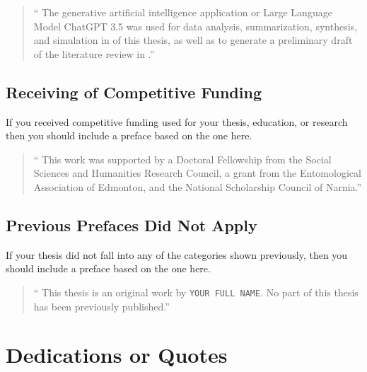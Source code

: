 			\begin{quote}
				\singlespacing
				\enquote{%
					The generative artificial intelligence application or Large Language Model ChatGPT 3.5 was used for data analysis, summarization, synthesis, and simulation in  of this thesis, as well as to generate a preliminary draft of the literature review in .}
			\end{quote}

		\subsection{Receiving of Competitive Funding}\label{preface:CF}
			If you received competitive funding used for your thesis, education, or research then you should include a preface based on the one here.
	
			\begin{quote}
				\singlespacing
				\enquote{%
					This work was supported by a Doctoral Fellowship from the Social Sciences and Humanities Research Council, a grant from the Entomological Association of Edmonton, and the National Scholarship Council of Narnia.}
			\end{quote}

		\subsection{Previous Prefaces Did Not Apply}\label{preface:DNA}

			If your thesis did not fall into any of the categories shown previously, then you should include a preface based on the one here. 

			\begin{quote}
				\singlespacing
				\enquote{%
					This thesis is an original work by \texttt{YOUR FULL NAME}. 
					No part of this thesis has been previously published.}
			\end{quote}

	\section{Dedications or Quotes}
		

